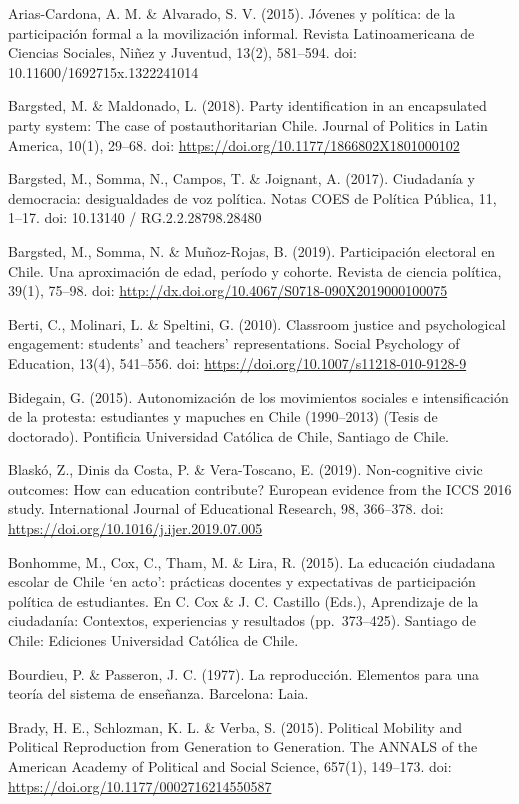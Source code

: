 \documentclass[12pt,twoside]{templates/facsothesis}
\begin{document}
Arias-Cardona, A. M. \& Alvarado, S. V. (2015). Jóvenes y política: de la participación formal a la movilización informal. Revista Latinoamericana de Ciencias Sociales, Niñez y Juventud, 13(2), 581--594. doi: 10.11600/1692715x.1322241014

Bargsted, M. \& Maldonado, L. (2018). Party identification in an encapsulated party system: The case of postauthoritarian Chile. Journal of Politics in Latin America, 10(1), 29--68. doi: \url{https://doi.org/10.1177/1866802X1801000102}

Bargsted, M., Somma, N., Campos, T. \& Joignant, A. (2017). Ciudadanía y democracia: desigualdades de voz política. Notas COES de Política Pública, 11, 1--17. doi: 10.13140 / RG.2.2.28798.28480

Bargsted, M., Somma, N. \& Muñoz-Rojas, B. (2019). Participación electoral en Chile. Una aproximación de edad, período y cohorte. Revista de ciencia política, 39(1), 75--98. doi: \url{http://dx.doi.org/10.4067/S0718-090X2019000100075}

Berti, C., Molinari, L. \& Speltini, G. (2010). Classroom justice and psychological engagement: students' and teachers' representations. Social Psychology of Education, 13(4), 541--556. doi: \url{https://doi.org/10.1007/s11218-010-9128-9}

Bidegain, G. (2015). Autonomización de los movimientos sociales e intensificación de la protesta: estudiantes y mapuches en Chile (1990--2013) (Tesis de doctorado). Pontificia Universidad Católica de Chile, Santiago de Chile.

Blaskó, Z., Dinis da Costa, P. \& Vera-Toscano, E. (2019). Non-cognitive civic outcomes: How can education contribute? European evidence from the ICCS 2016 study. International Journal of Educational Research, 98, 366--378. doi: \url{https://doi.org/10.1016/j.ijer.2019.07.005}

Bonhomme, M., Cox, C., Tham, M. \& Lira, R. (2015). La educación ciudadana escolar de Chile `en acto': prácticas docentes y expectativas de participación política de estudiantes. En C. Cox \& J. C. Castillo (Eds.), Aprendizaje de la ciudadanía: Contextos, experiencias y resultados (pp.~373--425). Santiago de Chile: Ediciones Universidad Católica de Chile.

Bourdieu, P. \& Passeron, J. C. (1977). La reproducción. Elementos para una teoría del sistema de enseñanza. Barcelona: Laia.

Brady, H. E., Schlozman, K. L. \& Verba, S. (2015). Political Mobility and Political Reproduction from Generation to Generation. The ANNALS of the American Academy of Political and Social Science, 657(1), 149--173. doi: \url{https://doi.org/10.1177/0002716214550587}
\end{document}
